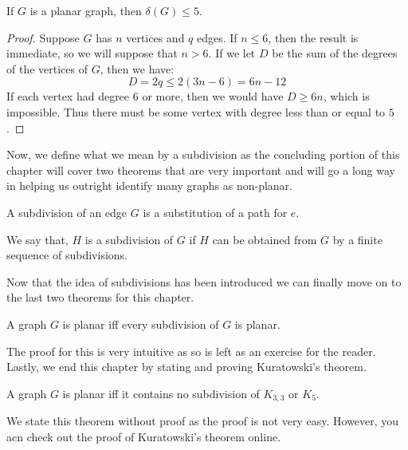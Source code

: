 \documentclass[../basic_graph_theory.tex]{subfiles}
\begin{document}
\begin{thm}
    If $G$ is a planar graph, then $\delta(G) \le 5$.
\end{thm}
\begin{proof}
    Suppose $G$ has $n$ vertices and $q$ edges. If $n \le 6$, then the result is immediate, so we will suppose that $n > 6$. If we let $D$ be the sum of the degrees of the vertices of $G$, then we have:\\
    \begin{equation*}
        D = 2q \le 2(3n - 6) = 6n - 12
    \end{equation*}
    If each vertex had degree $6$ or more, then we would have $D \ge 6n$, which is impossible. Thus there must be some vertex with degree less than or equal to $5$.
\end{proof}

Now, we define what we mean by a subdivision as the concluding portion of this chapter will cover two theorems that are very important and will go a long way in helping us outright identify many graphs as non-planar.\\

\begin{defn}
    A subdivision of an edge $G$ is a substitution of a path for $e$.
\end{defn}
\begin{defn}
    We say that, $H$ is a subdivision of $G$ if $H$ can be obtained from $G$ by a finite sequence of subdivisions.
\end{defn}

Now that the idea of subdivisions has been introduced we can finally move on to the last two theorems for this chapter.
\begin{thm}
    A graph $G$ is planar iff every subdivision of $G$ is planar.
\end{thm}
The proof for this is very intuitive as so is left as an exercise for the reader.\\
Lastly, we end this chapter by stating and proving Kuratowski's theorem.\\
\begin{thm}
    A graph $G$ is planar iff it contains no subdivision of $K_{3,3}$ or $K_{5}$.
\end{thm}
We state this theorem without proof as the proof is not very easy. However, you acn check out the proof of Kuratowski's theorem online.
\end{document}
